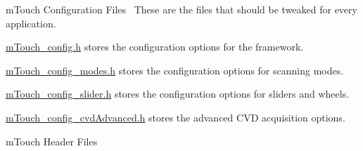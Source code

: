 \begin{DoxyItemize}
\begin{DoxyItemize}
\begin{DoxyItemize}
\begin{DoxyItemize}
\begin{DoxyItemize}
\end{DoxyItemize}
\item m\+Touch Configuration Files~\newline
 These are the files that should be tweaked for every application. 
\begin{DoxyItemize}
\item \hyperlink{m_touch__config_8h}{m\+Touch\+\_\+config.\+h} stores the configuration options for the framework. 
\item \hyperlink{m_touch__config__modes_8h}{m\+Touch\+\_\+config\+\_\+modes.\+h} stores the configuration options for scanning modes. 
\item \hyperlink{m_touch__config__slider_8h}{m\+Touch\+\_\+config\+\_\+slider.\+h} stores the configuration options for sliders and wheels. 
\item \hyperlink{m_touch__config__cvd_advanced_8h}{m\+Touch\+\_\+config\+\_\+cvd\+Advanced.\+h} stores the advanced C\+V\+D acquisition options. 
\end{DoxyItemize}
\item m\+Touch Header Files~\newline
 

\end{DoxyItemize}
\end{DoxyItemize}
\end{DoxyItemize}
\end{DoxyItemize}
